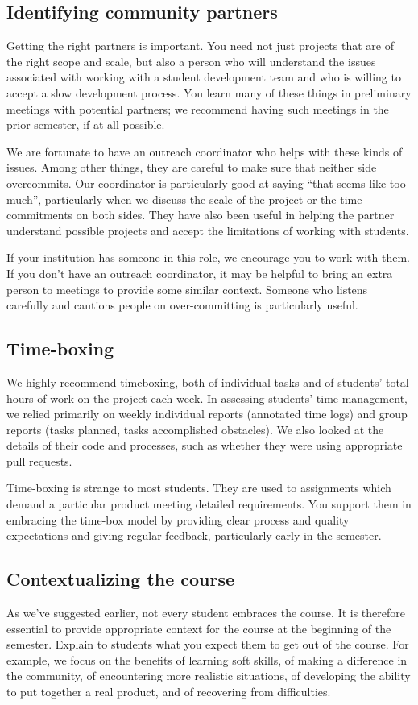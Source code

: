 \subsection{Identifying community partners}

Getting the right partners is important.  You need not just projects that
are of the right scope and scale, but also a person who will understand
the issues associated with working with a student development team and
who is willing to accept a slow development process.  You learn many of
these things in preliminary meetings with potential partners; we recommend
having such meetings in the prior semester, if at all possible.

We are fortunate to have an outreach coordinator who helps with these kinds
of issues.  Among other things, they are careful to make sure that neither
side overcommits.  Our coordinator is particularly good at saying ``that
seems like too much'', particularly when we discuss the scale of the project
or the time commitments on both sides.  They have also been useful in
helping the partner understand possible projects and accept the limitations
of working with students.

If your institution has someone in this role, we encourage you to work with
them.  If you don't have an outreach coordinator, it may be helpful to
bring an extra person to meetings to provide some similar context.  Someone
who listens carefully and cautions people on over-committing is particularly
useful.

\subsection{Time-boxing}

We highly recommend timeboxing, both of individual tasks and of students' 
total hours of work on the project each week.
In assessing students' time management, we relied primarily on
weekly individual reports (annotated time logs) and group reports
(tasks planned, tasks accomplished obstacles).  We also looked at the
details of their code and processes, such as whether they were using
appropriate pull requests.

Time-boxing is strange to most students.  They are used to assignments 
which demand a particular
product meeting detailed requirements.  You support them in embracing the
time-box model by providing clear process and quality expectations and
giving regular feedback, particularly early in the semester.

\subsection{Contextualizing the course}

As we've suggested earlier, not every student embraces the course.  It
is therefore essential to provide appropriate context for the course at
the beginning of the semester.  Explain to students what you expect them
to get out of the course.  For example, we focus on the benefits of learning
soft skills, of making a difference in the community, of encountering
more realistic situations, of developing the ability to put together a
real product, and of recovering from difficulties.
